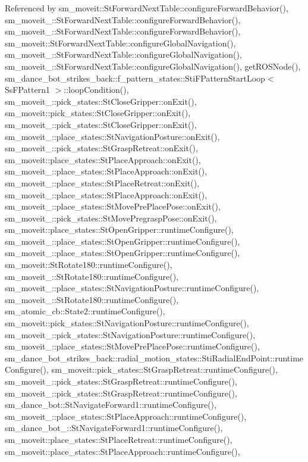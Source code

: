 Referenced by sm\+\_\+moveit\+::\+St\+Forward\+Next\+Table\+::configure\+Forward\+Behavior(), sm\+\_\+moveit\+\_\+::\+St\+Forward\+Next\+Table\+::configure\+Forward\+Behavior(), sm\+\_\+moveit\+\_\+::\+St\+Forward\+Next\+Table\+::configure\+Forward\+Behavior(), sm\+\_\+moveit\+::\+St\+Forward\+Next\+Table\+::configure\+Global\+Navigation(), sm\+\_\+moveit\+\_\+::\+St\+Forward\+Next\+Table\+::configure\+Global\+Navigation(), sm\+\_\+moveit\+\_\+::\+St\+Forward\+Next\+Table\+::configure\+Global\+Navigation(), get\+R\+O\+S\+Node(), sm\+\_\+dance\+\_\+bot\+\_\+strikes\+\_\+back\+::f\+\_\+pattern\+\_\+states\+::\+Sti\+F\+Pattern\+Start\+Loop$<$ Ss\+F\+Pattern1 $>$\+::loop\+Condition(), sm\+\_\+moveit\+\_\+::pick\+\_\+states\+::\+St\+Close\+Gripper\+::on\+Exit(), sm\+\_\+moveit\+::pick\+\_\+states\+::\+St\+Close\+Gripper\+::on\+Exit(), sm\+\_\+moveit\+\_\+::pick\+\_\+states\+::\+St\+Close\+Gripper\+::on\+Exit(), sm\+\_\+moveit\+\_\+::place\+\_\+states\+::\+St\+Navigation\+Posture\+::on\+Exit(), sm\+\_\+moveit\+\_\+::pick\+\_\+states\+::\+St\+Grasp\+Retreat\+::on\+Exit(), sm\+\_\+moveit\+::place\+\_\+states\+::\+St\+Place\+Approach\+::on\+Exit(), sm\+\_\+moveit\+\_\+::place\+\_\+states\+::\+St\+Place\+Approach\+::on\+Exit(), sm\+\_\+moveit\+\_\+::place\+\_\+states\+::\+St\+Place\+Retreat\+::on\+Exit(), sm\+\_\+moveit\+\_\+::place\+\_\+states\+::\+St\+Place\+Approach\+::on\+Exit(), sm\+\_\+moveit\+\_\+::place\+\_\+states\+::\+St\+Move\+Pre\+Place\+Pose\+::on\+Exit(), sm\+\_\+moveit\+\_\+::pick\+\_\+states\+::\+St\+Move\+Pregrasp\+Pose\+::on\+Exit(), sm\+\_\+moveit\+::place\+\_\+states\+::\+St\+Open\+Gripper\+::runtime\+Configure(), sm\+\_\+moveit\+\_\+::place\+\_\+states\+::\+St\+Open\+Gripper\+::runtime\+Configure(), sm\+\_\+moveit\+\_\+::place\+\_\+states\+::\+St\+Open\+Gripper\+::runtime\+Configure(), sm\+\_\+moveit\+::\+St\+Rotate180\+::runtime\+Configure(), sm\+\_\+moveit\+\_\+::\+St\+Rotate180\+::runtime\+Configure(), sm\+\_\+moveit\+\_\+::place\+\_\+states\+::\+St\+Navigation\+Posture\+::runtime\+Configure(), sm\+\_\+moveit\+\_\+::\+St\+Rotate180\+::runtime\+Configure(), sm\+\_\+atomic\+\_\+cb\+::\+State2\+::runtime\+Configure(), sm\+\_\+moveit\+::pick\+\_\+states\+::\+St\+Navigation\+Posture\+::runtime\+Configure(), sm\+\_\+moveit\+\_\+::pick\+\_\+states\+::\+St\+Navigation\+Posture\+::runtime\+Configure(), sm\+\_\+moveit\+\_\+::place\+\_\+states\+::\+St\+Move\+Pre\+Place\+Pose\+::runtime\+Configure(), sm\+\_\+dance\+\_\+bot\+\_\+strikes\+\_\+back\+::radial\+\_\+motion\+\_\+states\+::\+Sti\+Radial\+End\+Point\+::runtime\+Configure(), sm\+\_\+moveit\+::pick\+\_\+states\+::\+St\+Grasp\+Retreat\+::runtime\+Configure(), sm\+\_\+moveit\+\_\+::pick\+\_\+states\+::\+St\+Grasp\+Retreat\+::runtime\+Configure(), sm\+\_\+moveit\+\_\+::pick\+\_\+states\+::\+St\+Grasp\+Retreat\+::runtime\+Configure(), sm\+\_\+dance\+\_\+bot\+::\+St\+Navigate\+Forward1\+::runtime\+Configure(), sm\+\_\+moveit\+\_\+::place\+\_\+states\+::\+St\+Place\+Approach\+::runtime\+Configure(), sm\+\_\+dance\+\_\+bot\+\_\+::\+St\+Navigate\+Forward1\+::runtime\+Configure(), sm\+\_\+moveit\+::place\+\_\+states\+::\+St\+Place\+Retreat\+::runtime\+Configure(), sm\+\_\+moveit\+::place\+\_\+states\+::\+St\+Place\+Approach\+::runtime\+Configure(), 